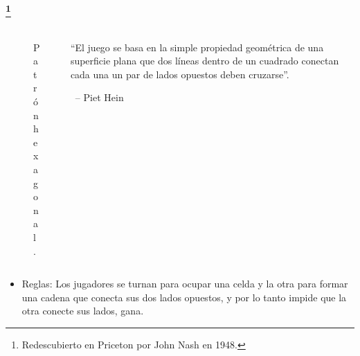 \documentclass[spanish, utf8,handout]{beamer} %
\theoremstyle{definition}
\begin{document}
\begin{frame}\transblindsvertical
\frametitle{\insertsubsection\footnote{Redescubierto en Priceton por John Nash en 1948.}}

\begin{columns}[t]
	\begin{column}{.4\textwidth}
			\begin{figure}[ht]
				\scalebox{.32}{}
				\caption{Patrón hexagonal.}
			\end{figure}%
	\end{column}
	\begin{column}{.38\textwidth}
		\begin{flushleft}
		``El juego se basa en la simple propiedad geométrica de una superficie plana que dos líneas dentro de un cuadrado conectan cada una un par de lados opuestos deben cruzarse''.
		\end{flushleft}
		\		
		-- Piet Hein
	\end{column}
\end{columns}

\vspace*{5pt}

\begin{itemize}
	\item Reglas: Los jugadores se turnan para ocupar una celda y la otra para formar una cadena que conecta sus dos lados opuestos, y por lo tanto impide que la otra conecte sus lados, gana.
\end{itemize}
\end{frame}

%	
%
%
\end{document}

